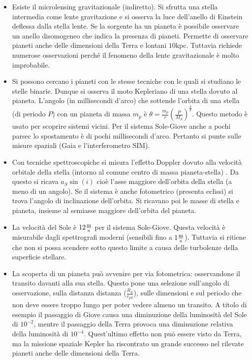\documentclass[11pt,a4paper]{article}
\begin{document}
\begin{itemize}
\item Esiste il microlensing gravitazionale (indiretto). Si sfrutta una stella intermedia come lente gravitazione e si osserva la luce dell'anello di Einstein deflessa dalla stella lente. Se la sorgente ha un pianeta è possibile osservare un anello disomogeneo che indica la presenza di pianeti. Permette di osservare pianeti anche delle dimensioni della Terra e lontani $10$kpc. Tuttavia richiede numerose osservazioni perché il fenomeno della lente gravitazionale è molto improbabile.

\item Si possono cercano i pianeti con le stesse tecniche con le quali si studiano le stelle binarie. Dunque si osserva il moto Kepleriano di una stella dovuto al pianeta. L'angolo (in millisecondi d'arco) che sottende l'orbita di una stella (di periodo $P$) con un pianeta di massa $m_p$ è $\theta = \frac{m_p}{r} \left( \frac{P}{M_{S}} \right)^{\frac{2}{3}}$. Questo metodo è usato per scoprire sistemi vicini. Per il sistema Sole-Giove anche a pochi parsec lo spostamento è di pochi millisecondi d'arco. Pertanto si punte sulle misure spaziali (Gaia e l'interferometro SIM).

\item Con tecniche spettroscopiche si misura l'effetto Doppler dovuto alla velocità orbitale della stella (intorno al comune centro di massa pianeta-stella) . Da questo si ricava $a_{S} \sin(i)$ cioè l'asse maggiore dell'orbita della stella (a meno di un angolo). Se il sistema è anche fotometrico (presenta eclissi) si trova l'angolo di inclinazione dell'orbita. Si ricavano poi le masse di stella e pianeta, insieme al semiasse maggiore dell'orbita del pianeta. 

\item La velocità del Sole è $12 \si{\frac{\meter}{\second}}$ per il sistema Sole-Giove. Questa velocità è misurabile dagli spettrografi moderni (sensibili fino a $1 \si{\frac{\meter}{\second}}$). Tuttavia si ritiene che non si possa scendere sotto questo limite a causa delle turbolenze della superficie stellare.

\item La scoperta di un pianeta può avvenire per via fotometrica: osservandone il transito davanti alla sua stella. Questo pone una selezione sull'angolo di osservazione, sulla distanza distanza ($\frac{R_S}{r_{pS}}$), sulle dimensioni e sul periodo che non deve essere troppo lungo per poter vedere almeno un transito. A titolo di esempio il passaggio di Giove causa una diminuzione della luminosità del Sole di $10^{-2}$, mentre il passaggio della Terra provoca una diminuzione relativa della luminosità di $10^{-4}$. Quest'ultimo effetto non può essere visto da Terra, ma la missione spaziale Kepler ha riscontrato un grande successo nel rilevate pianeti anche delle dimensioni della Terra.


\end{itemize}
\end{document}
